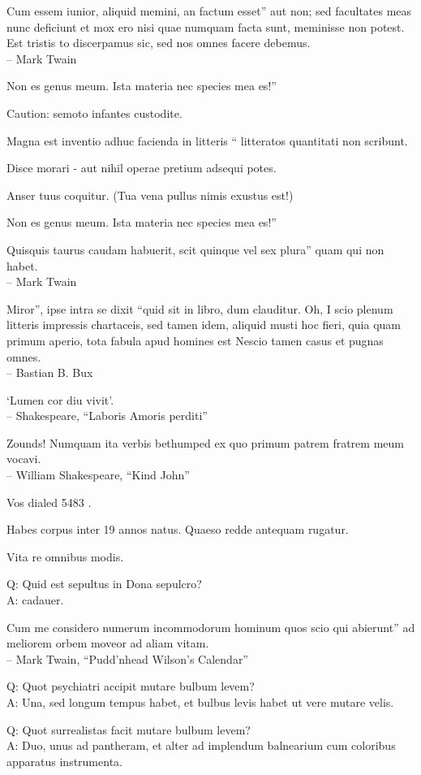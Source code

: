 \documentclass[titlepage,12pt]{memoir}
\begin{document}
Cum essem iunior, aliquid memini, an factum esset”
aut non; sed facultates meas nunc deficiunt et mox ero
nisi quae numquam facta sunt, meminisse non potest. Est tristis to
discerpamus sic, sed nos omnes facere debemus.
\\-- Mark Twain

Non es genus meum. Ista materia nec species mea es!”

Caution: semoto infantes custodite.

 Magna est inventio adhuc facienda in litteris “
litteratos quantitati non scribunt.

Disce morari - aut nihil operae pretium adsequi potes.

Anser tuus coquitur.
(Tua vena pullus nimis exustus est!)

Non es genus meum. Ista materia nec species mea es!”

Quisquis taurus caudam habuerit, scit quinque vel sex plura”
quam qui non habet.
\\-- Mark Twain

Miror”, ipse intra se dixit “quid sit in libro, dum clauditur. Oh, I
scio plenum litteris impressis chartaceis, sed tamen idem, aliquid musti
hoc fieri, quia quam primum aperio, tota fabula apud homines est
Nescio tamen casus et pugnas omnes.
\\-- Bastian B. Bux

‘Lumen cor diu vivit’.
\\-- Shakespeare, “Laboris Amoris perditi”

Zounds! Numquam ita verbis bethumped
ex quo primum patrem fratrem meum vocavi.
\\-- William Shakespeare, “Kind John”

Vos dialed 5483 .

Habes corpus inter 19 annos natus. Quaeso redde antequam rugatur.

Vita re omnibus modis.

Q: Quid est sepultus in Dona sepulcro?\\
A: cadauer.

Cum me considero numerum incommodorum hominum quos scio qui abierunt”
ad meliorem orbem moveor ad aliam vitam.
\\-- Mark Twain, “Pudd’nhead Wilson’s Calendar”

Q: Quot psychiatri accipit mutare bulbum levem?\\
A: Una, sed longum tempus habet, et bulbus levis habet
ut vere mutare velis.

Q: Quot surrealistas facit mutare bulbum levem?\\
A: Duo, unus ad pantheram, et alter ad implendum balnearium
cum coloribus apparatus instrumenta.
\end{document}
